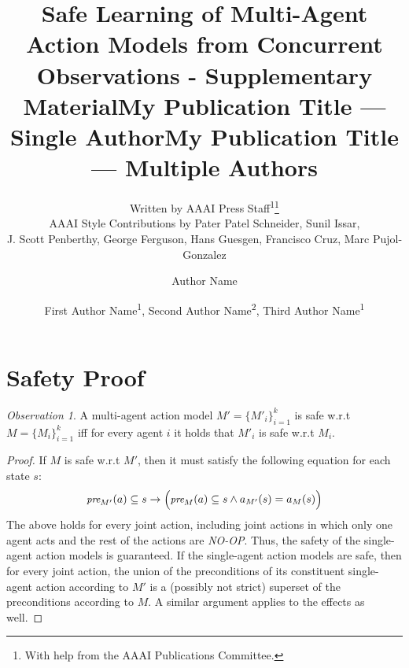 \documentclass[letterpaper]{article} %
\title{Safe Learning of Multi-Agent Action Models from Concurrent Observations - Supplementary Material}
\author{
    Written by AAAI Press Staff\textsuperscript{\rm 1}\thanks{With help from the AAAI Publications Committee.}\\
    AAAI Style Contributions by Pater Patel Schneider,
    Sunil Issar,\\
    J. Scott Penberthy,
    George Ferguson,
    Hans Guesgen,
    Francisco Cruz\equalcontrib,
    Marc Pujol-Gonzalez\equalcontrib
}
\title{My Publication Title --- Single Author}
\author {
    Author Name
}
\title{My Publication Title --- Multiple Authors}
\author {
    First Author Name\textsuperscript{\rm 1},
    Second Author Name\textsuperscript{\rm 2},
    Third Author Name\textsuperscript{\rm 1}
}
\newcommand{\pre}{\textit{pre}}
\theoremstyle{definition}
\theoremstyle{remark}
\newtheorem{observation}{Observation}
\newcommand{\noop}{\textit{NO-OP}\xspace}
\begin{document}
\maketitle

\section{Safety Proof}
\begin{observation}
A multi-agent action model $M'=\{M'_i\}_{i=1}^k$ is safe w.r.t $M=\{M_i\}_{i=1}^k$ iff for every agent $i$ it holds that $M'_i$ is safe w.r.t $M_i$.
\end{observation}
\begin{proof}
If $M$ is safe w.r.t $M'$, then it must satisfy the following equation for each state $s$:
\begin{equation}
\small
    \pre_{M'}(a)\subseteq s \rightarrow 
    \Big(\pre_M(a)\subseteq s \wedge 
    a_{M'}(s)=a_M(s)\Big)
    \label{eq:safe_action_model}
\end{equation}
The above holds for every joint action, including
joint actions in which only one agent acts and the rest of the actions are \noop. Thus, the safety of the single-agent action models is guaranteed. 
If the single-agent action models are safe, then for every joint action, the union of the preconditions of its constituent single-agent action according to $M'$ is a (possibly not strict) superset of the preconditions according to $M$. A similar argument applies to the effects as well.
\end{proof} 
\end{document}
